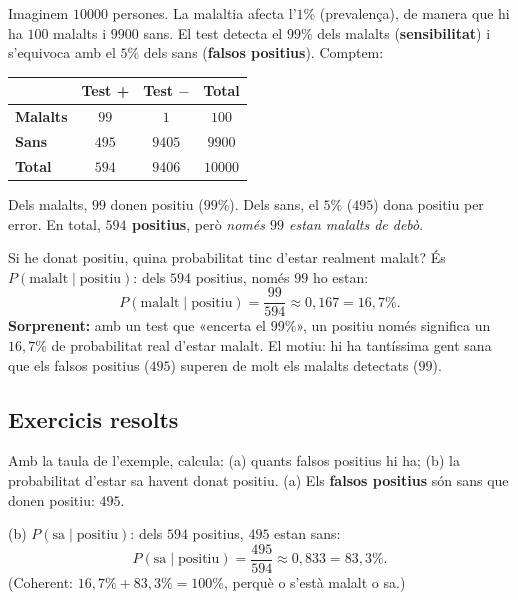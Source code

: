 \begin{exemple}
Imaginem $\num{10000}$ persones. La malaltia afecta l'\textbf{$1\%$} (prevalença), de
manera que hi ha $100$ malalts i $\num{9900}$ sans. El test detecta el $99\%$ dels
malalts (\textbf{sensibilitat}) i s'equivoca amb el $5\%$ dels sans (\textbf{falsos
positius}). Comptem:

\begin{center}
\renewcommand{\arraystretch}{1.3}
\begin{tabular}{l c c c}
\toprule
 & \textbf{Test +} & \textbf{Test $-$} & \textbf{Total} \\
\midrule
\textbf{Malalts} & $99$ & $1$ & $100$ \\
\textbf{Sans} & $495$ & $\num{9405}$ & $\num{9900}$ \\
\midrule
\textbf{Total} & $594$ & $\num{9406}$ & $\num{10000}$ \\
\bottomrule
\end{tabular}
\end{center}

Dels malalts, $99$ donen positiu ($99\%$). Dels sans, el $5\%$ ($495$) dona positiu per
error. En total, \textbf{$594$ positius}, però \emph{només $99$ estan malalts de debò}.
\end{exemple}

\begin{exemple}
Si he donat positiu, quina probabilitat tinc d'estar realment malalt? És
$P(\text{malalt}\mid\text{positiu})$: dels $594$ positius, només $99$ ho estan:
\[
P(\text{malalt}\mid\text{positiu})=\frac{99}{594}\approx 0,167=16,7\%.
\]
\textbf{Sorprenent:} amb un test que «encerta el $99\%$», un positiu només significa un
$16,7\%$ de probabilitat real d'estar malalt. El motiu: hi ha tantíssima gent sana que
els falsos positius ($495$) superen de molt els malalts detectats ($99$).
\end{exemple}

\subsection{Exercicis resolts}

\begin{exresolt}
Amb la taula de l'exemple, calcula: (a) quants falsos positius hi ha; (b) la
probabilitat d'estar sa havent donat positiu.
\solucio
(a) Els \textbf{falsos positius} són sans que donen positiu: $495$.

(b) $P(\text{sa}\mid\text{positiu})$: dels $594$ positius, $495$ estan sans:
\[
P(\text{sa}\mid\text{positiu})=\frac{495}{594}\approx 0,833=83,3\%.
\]
(Coherent: $16,7\%+83,3\%=100\%$, perquè o s'està malalt o sa.)
\end{exresolt}

